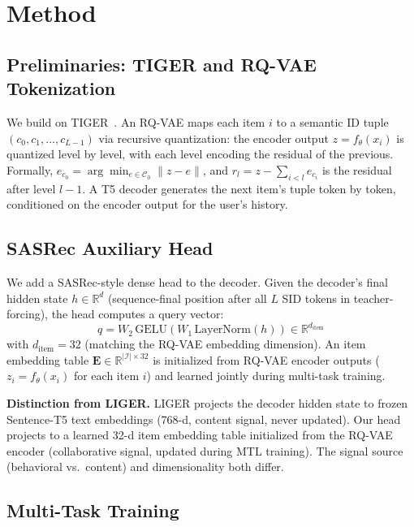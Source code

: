 \section{Method}
\label{sec:method}

\subsection{Preliminaries: TIGER and RQ-VAE Tokenization}

We build on TIGER~\cite{rajput2023tiger}. An RQ-VAE maps each item $i$ to a semantic ID tuple $(c_0, c_1, \ldots, c_{L-1})$ via recursive quantization: the encoder output $z = f_\theta(x_i)$ is quantized level by level, with each level encoding the residual of the previous. Formally, $e_{c_0} = \arg\min_{e \in \mathcal{C}_0} \|z - e\|$, and $r_l = z - \sum_{i < l} e_{c_i}$ is the residual after level $l-1$. A T5 decoder generates the next item's tuple token by token, conditioned on the encoder output for the user's history.

\subsection{SASRec Auxiliary Head}
\label{sec:sasrec-head}

We add a SASRec-style dense head to the decoder. Given the decoder's final hidden state $h \in \mathbb{R}^d$ (sequence-final position after all $L$ SID tokens in teacher-forcing), the head computes a query vector:
%
\begin{equation}
  q = W_2\,\mathrm{GELU}(W_1\,\mathrm{LayerNorm}(h)) \in \mathbb{R}^{d_\text{item}}
\end{equation}
%
with $d_\text{item} = 32$ (matching the RQ-VAE embedding dimension). An item embedding table $\mathbf{E} \in \mathbb{R}^{|\mathcal{I}| \times 32}$ is initialized from RQ-VAE encoder outputs ($z_i = f_\theta(x_i)$ for each item $i$) and learned jointly during multi-task training.

\textbf{Distinction from LIGER.} LIGER projects the decoder hidden state to frozen Sentence-T5 text embeddings (768-d, content signal, never updated). Our head projects to a learned 32-d item embedding table initialized from the RQ-VAE encoder (collaborative signal, updated during MTL training). The signal source (behavioral vs.\ content) and dimensionality both differ.

\subsection{Multi-Task Training}

